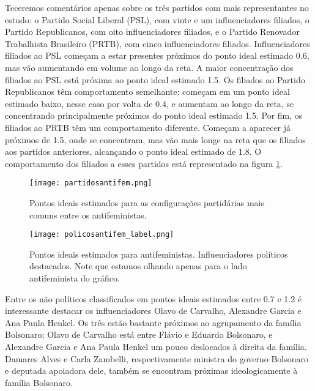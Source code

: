 \documentclass[
	12pt,				%
	openright,			%
	twoside,			%
	a4paper,			%
	english,			%
	brazil				%
	]{abntex2}
\begin{document}
 Teceremos comentários apenas sobre os três partidos com mais representantes no estudo: o Partido Social Liberal (PSL), com vinte e um influenciadores filiados, o Partido Republicanos, com oito influenciadores filiados, e o Partido Renovador Trabalhista Brasileiro (PRTB), com cinco influenciadores filiados. Influenciadores filiados ao PSL começam a estar presentes próximos do ponto ideal estimado 0.6, mas vão aumentando em volume ao longo da reta. A maior concentração dos filiados ao PSL está próxima ao ponto ideal estimado 1.5. Os filiados ao Partido Republicanos têm comportamento semelhante: começam em um ponto ideal estimado baixo, nesse caso por volta de 0.4, e aumentam ao longo da reta, se concentrando principalmente próximos do ponto ideal estimado 1.5. Por fim, os filiados ao PRTB têm um comportamento diferente. Começam a aparecer já próximos de 1.5, onde se concentram, mas vão mais longe na reta que os filiados aos partidos anteriores, alcançando o ponto ideal estimado de 1.8. O comportamento dos filiados a esses partidos está representado na figura \ref{partidosantifem}.
 
 \begin{figure}[!htbp]
    \centering
    \texttt{[image: partidosantifem.png]}
    \caption{Pontos ideais estimados para as configurações partidárias mais comuns entre os antifeministas.}
    \label{partidosantifem}
 \end{figure}
 
 \begin{figure}[!htbp]
    \centering
    \texttt{[image: policosantifem\_label.png]}
    \caption{Pontos ideais estimados para antifeministas. Influenciadores políticos destacados. Note que estamos olhando apenas para o lado antifeminista do gráfico.}
    \label{politicosantifem}
 \end{figure}
 
 Entre os não políticos classificados em pontos ideais estimados entre 0.7 e 1.2 é interessante destacar os influenciadores Olavo de Carvalho, Alexandre Garcia e Ana Paula Henkel. Os três estão bastante próximos ao agrupamento da família Bolsonaro; Olavo de Carvalho está entre Flávio e Eduardo Bolsonaro, e Alexandre Garcia e Ana Paula Henkel um pouco deslocados à direita da família. Damares Alves e Carla Zambelli, respectivamente ministra do governo Bolsonaro e deputada apoiadora dele, também se encontram próximas ideologicamente à família Bolsonaro.
 
\end{document}

